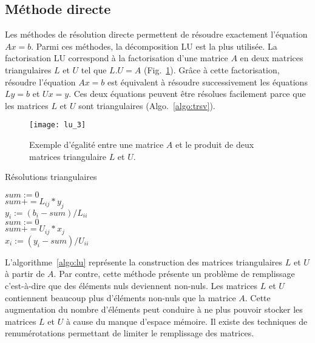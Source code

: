 \subsection{Méthode directe}
Les méthodes de résolution directe permettent de résoudre exactement l'équation $Ax=b$.
%
Parmi ces méthodes, la décomposition LU est la plus utilisée.
%
La factorisation LU correspond à la factorisation d'une matrice $A$ en deux matrices triangulaires $L$ et $U$ tel que $L.U=A$ (Fig.~\ref{fig:lu_3}).
%
Grâce à cette factorisation, résoudre l'équation $Ax=b$ est équivalent à résoudre successivement les équations $Ly=b$ et $Ux=y$.
%
Ces deux équations peuvent être résolues facilement parce que les matrices $L$ et $U$ sont triangulaires (Algo.~\ref{algo:trsv}).
\begin{figure}[!h]
  \centering
  \texttt{[image: lu\_3]}
  \caption{Exemple d'égalité entre une matrice $A$ et le produit de deux matrices triangulaire $L$ et $U$.}
  \label{fig:lu_3}
\end{figure}
\begin{algorithm}
  \caption{Résolutions triangulaires}
  \label{algo:trsv}
   {
    $sum := 0$\\
     {
      $sum += L_{ij} * y_j$ \\
    }
    $y_i := (b_i-sum)/L_{ii}$ \\
  }
   {
    $sum := 0$\\
     {
      $sum += U_{ij} * x_j$ \\
    }
    $x_i := (y_i-sum)/U_{ii}$ \\
  }
\end{algorithm}
L'algorithme~\ref{algo:lu} représente la construction des matrices triangulaires $L$ et $U$ à partir de $A$.
%
Par contre, cette méthode présente un problème de remplissage c'est-à-dire que des éléments nuls deviennent non-nuls.
%
Les matrices $L$ et $U$ contiennent beaucoup plus d'éléments non-nuls que la matrice $A$.
%
Cette augmentation du nombre d'éléments peut conduire à ne plus pouvoir stocker les matrices $L$ et $U$ à cause du manque d'espace mémoire.
%
Il existe des techniques de renumérotations permettant de limiter le remplissage des matrices\cite{faverge_thesis}.

